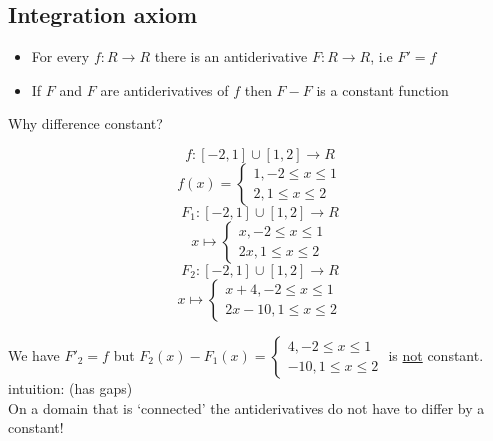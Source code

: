 \documentclass[a4paper, 12pt]{article}
\begin{document}
\subsection{Integration axiom}
\begin{itemize}
\item For every $f: R \rightarrow R$ there is an antiderivative $F:R \rightarrow R$, i.e $F' = f$
\item If $F$ and $F$ are antiderivatives of $f$ then $F - F$ is a constant function
\end{itemize}
Why difference constant?
\begin{multicols}{2}
\vfill \null
$$ f: [-2,1] \cup [1,2] \rightarrow R$$
\begin{equation*}
f(x) = 
\begin{cases}
1, -2 \leq x \leq 1 \\
2, 1 \leq x \leq 2
\end{cases}
\end{equation*}
$$ F_1: [-2,1] \cup [1,2] \rightarrow R$$
\begin{equation*}
x \mapsto 
\begin{cases}
x, -2 \leq x \leq 1 \\
2x, 1 \leq x \leq 2
\end{cases}
\end{equation*}
$$ F_2: [-2,1] \cup [1,2] \rightarrow R$$
\begin{equation*}
x \mapsto 
\begin{cases}
x+4, -2 \leq x \leq 1 \\
2x-10, 1 \leq x \leq 2
\end{cases}
\end{equation*}
\end{multicols}
We have $F'_2 = f$ but $F_2(x) - F_1(x) = \begin{cases} 4, -2 \leq x \leq 1\\ -10, 1 \leq x \leq 2 \end{cases}$ is \underline{not} constant.\\
intuition: (has gaps)\\
On a domain that is `connected' the antiderivatives do not have to differ by a constant!
\end{document}
